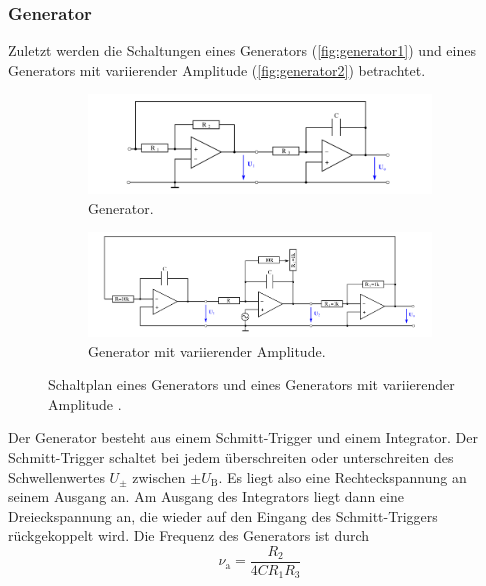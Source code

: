 \subsubsection{Generator}
Zuletzt werden die Schaltungen eines Generators (\autoref{fig:generator1}) und eines Generators mit variierender Amplitude (\autoref{fig:generator2}) betrachtet.
\begin{figure}
    \centering
    \begin{subfigure}{\textwidth}
        \includegraphics[width=\textwidth]{"content/pics/generator1.png"}
        \caption{Generator.}
        \label{fig:generator1}
    \end{subfigure}
    \vfill
    \begin{subfigure}{0.9\textwidth}
        \includegraphics[width=\textwidth]{"content/pics/generator2.png"}
        \caption{Generator mit variierender Amplitude.}
        \label{fig:generator2}
    \end{subfigure}
    \caption{Schaltplan eines Generators und eines Generators mit variierender Amplitude \cite{v51}.}
    \label{fig:generator}
\end{figure}
Der Generator besteht aus einem Schmitt-Trigger und einem Integrator. Der Schmitt-Trigger schaltet bei jedem überschreiten oder unterschreiten des Schwellenwertes $U_{\pm}$
zwischen $\pm U_\text{B}$. Es liegt also eine Rechteckspannung an seinem Ausgang an. Am Ausgang des Integrators liegt dann eine Dreieckspannung an, die wieder auf den Eingang des 
Schmitt-Triggers rückgekoppelt wird. 
Die Frequenz des Generators ist durch
\begin{equation}
\nu_\text{a} = \frac{R_2}{4C R_1 R_3}
\label{eq:freq_generator}
\end{equation}
